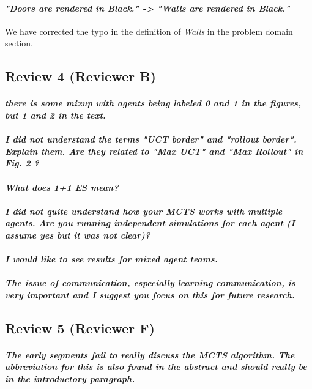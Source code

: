 \documentclass{article}
\begin{document}
\paragraph*{\textit{"Doors are rendered in Black." -> "Walls are rendered in Black."}}
We have corrected the typo in the definition of \emph{Walls} in the problem domain section.
\subsection{Review 4 (Reviewer B)}
\paragraph*{\textit{there is some mixup with agents being labeled 0 and 1 in the figures, but 1 and 2 in the text.}}

\paragraph*{\textit{I did not understand the terms "UCT border" and "rollout border". Explain them. Are they related to "Max UCT" and "Max Rollout" in Fig. 2 ?}}
\paragraph*{\textit{What does 1+1 ES mean?}}
\paragraph*{\textit{I did not quite understand how your MCTS works with multiple agents. Are you running independent simulations for each agent (I assume yes but it was not clear)? }}
\paragraph*{\textit{I would like to see results for mixed agent teams.}}
\paragraph*{\textit{The issue of communication, especially learning communication, is very important and I suggest you focus on this for future research.}}
\subsection{Review 5 (Reviewer F)}
\paragraph*{\textit{The early segments fail to really discuss the MCTS algorithm.  The abbreviation for this is also found in the abstract and should really be in the introductory paragraph.}}
\end{document}
